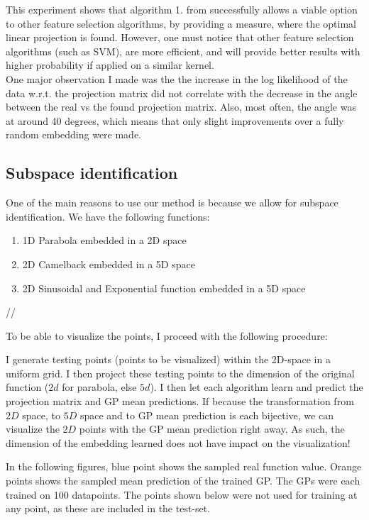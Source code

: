  This experiment shows that algorithm 1. from \citep{Tripathy} successfully allows a viable option to other feature selection algorithms, by providing a measure, where the optimal linear projection is found. 
 However, one must notice that other feature selection algorithms (such as SVM), are more efficient, and will provide better results with higher probability if applied on a similar kernel. \\
 
 One major observation I made was the the increase in the log likelihood of the data w.r.t. the projection matrix did not correlate with the decrease in the angle between the real vs the found projection matrix.
 Also, most often, the angle was at around 40 degrees, which means that only slight improvements over a fully random embedding were made.


\subsection{Subspace identification}
One of the main reasons to use our method is because we allow for subspace identification.
We have the following functions:

\begin{enumerate}
\item 1D Parabola embedded in a 2D space
\item 2D Camelback embedded in a 5D space
\item 2D Sinusoidal and Exponential function embedded in a 5D space
\end{enumerate} //

To be able to visualize the points, I proceed with the following procedure:

I generate testing points (points to be visualized) within the 2D-space in a uniform grid.
I then project these testing points to the dimension of the original function ($2d$ for parabola, else $5d$).
I then let each algorithm learn and predict the projection matrix and GP mean predictions.
If because the transformation from $2D$ space, to $5D$ space and to GP mean prediction is each bijective, we can visualize the $2D$ points with the GP mean prediction right away.
As such, the dimension of the embedding learned does not have impact on the visualization!

In the following figures, blue point shows the sampled real function value.
Orange points shows the sampled mean prediction of the trained GP.
The GPs were each trained on 100 datapoints. 
The points shown below were not used for training at any point, as these are included in the test-set.

